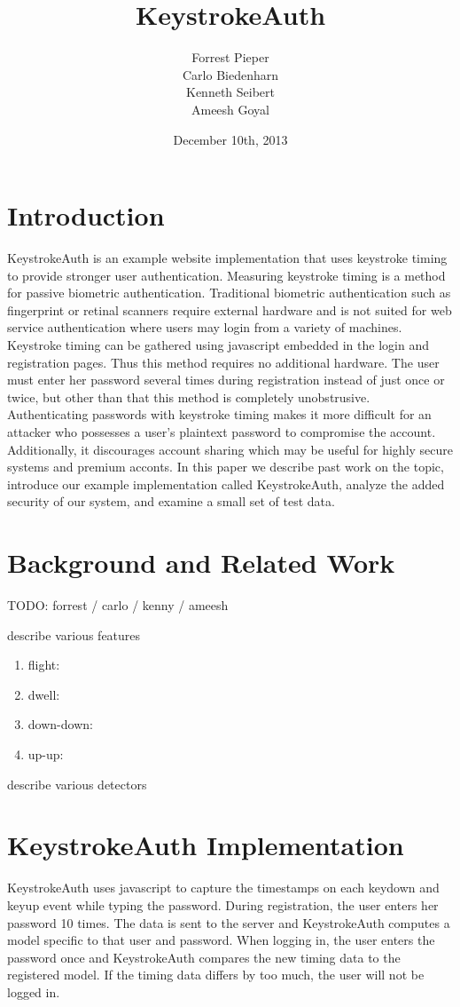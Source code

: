\documentclass{article}
\title{KeystrokeAuth}
\author{
  Forrest Pieper\\
  Carlo Biedenharn\\
  Kenneth Seibert\\
  Ameesh Goyal
}
\date{December 10th, 2013}
\begin{document}
\maketitle

\abstract{
}

\section{Introduction}
\label{introduction}
KeystrokeAuth is an example website implementation that uses keystroke timing to provide stronger user authentication.
Measuring keystroke timing is a method for passive biometric authentication. 
Traditional biometric authentication such as fingerprint or retinal scanners require external hardware and is not suited for web service authentication where users may login from a variety of machines. 
Keystroke timing can be gathered using javascript embedded in the login and registration pages.
Thus this method requires no additional hardware.
The user must enter her password several times during registration instead of just once or twice, but other than that this method is completely unobstrusive.
Authenticating passwords with keystroke timing makes it more difficult for an attacker who possesses a user's plaintext password to compromise the account.
Additionally, it discourages account sharing which may be useful for highly secure systems and premium acconts.
In this paper we describe past work on the topic, introduce our example implementation called KeystrokeAuth, analyze the added security of our system, and examine a small set of test data.

\section{Background and Related Work}
TODO: forrest / carlo / kenny / ameesh

describe various features
\begin{enumerate}
  \item flight:
  \item dwell:
  \item down-down:
  \item up-up:
\end{enumerate}

describe various detectors

\section{KeystrokeAuth Implementation}
KeystrokeAuth uses javascript to capture the timestamps on each keydown and keyup event while typing the password.
During registration, the user enters her password 10 times.
The data is sent to the server and KeystrokeAuth computes a model specific to that user and password.
When logging in, the user enters the password once and KeystrokeAuth compares the new timing data to the registered model.
If the timing data differs by too much, the user will not be logged in.
\end{document}
